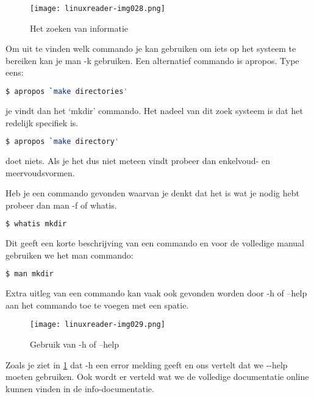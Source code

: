 \begin{figure}
\texttt{[image: linuxreader-img028.png]}
	\caption{Het zoeken van informatie}
\end{figure}

Om uit te vinden welk commando je kan gebruiken om iets op het systeem te bereiken kan je man -k gebruiken. Een
alternatief commando is apropos. Type eens:

\begin{lstlisting}[language=bash]
$ apropos `make directories'
\end{lstlisting}
je vindt dan het `mkdir' commando. Het nadeel van dit zoek systeem is dat het redelijk specifiek is.

\begin{lstlisting}[language=bash]
$ apropos `make directory'
\end{lstlisting}
doet niets. Als je het dus niet meteen vindt probeer dan enkelvoud- en meervoudsvormen.

Heb je een commando gevonden waarvan je denkt dat het is wat je nodig hebt probeer dan man -f of whatis.

\begin{lstlisting}[language=bash]
$ whatis mkdir
\end{lstlisting}

Dit geeft een korte beschrijving van een commando en voor de volledige manual gebruiken we het man commando:
\begin{lstlisting}[language=bash]
$ man mkdir
\end{lstlisting}

Extra uitleg van een commando kan vaak ook gevonden worden door -h of --help aan het commando toe te voegen met een
spatie.

\begin{figure}[H]
\texttt{[image: linuxreader-img029.png]}
	\label{fig:DocHelp}
	\caption{Gebruik van -h of --help}
\end{figure}

Zoals je ziet in \ref{fig:DocHelp} dat -h een error melding geeft en ons vertelt dat we -{}-help moeten gebruiken. Ook wordt er verteld wat we de
volledige documentatie online kunnen vinden in de info-documentatie.

